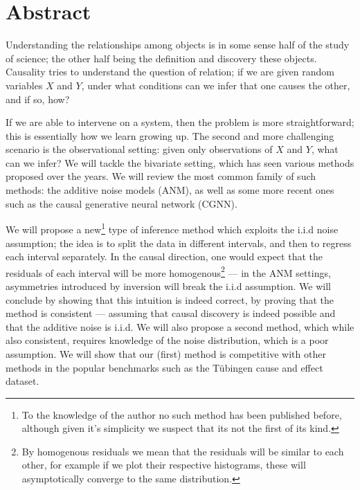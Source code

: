 

\cleardoublepage
\chapter*{Abstract}
\vspace{0.2\textheight}

Understanding the relationships among objects is in some sense half of the study of science; the other 
half being the definition and discovery these objects. Causality tries to understand the question of 
relation; if we are given random variables $X$ and $Y$, under what conditions can we infer that 
one causes the other, and if so, how? 


If we are able to intervene on a system, then the problem is more straightforward; this is essentially
how we learn growing up. The second and more challenging scenario is the observational setting: given 
only observations of $X$ and $Y$, what can we infer? We will tackle the bivariate setting, which has 
seen various methods proposed over the years. We will review the most common family of such methods: 
the additive noise models (ANM), as well as some more recent ones such as the causal generative neural 
network (CGNN). 

We will propose a new\footnote{To the knowledge of the author no such method has been published 
before, although given it's simplicity we suspect that its not the first of its kind.} 
type of inference method which exploits the i.i.d 
noise assumption; the idea is to split the data in different intervals, and then to regress each 
interval separately. In the causal direction, one would expect that the residuals of each 
interval will be more homogenous\footnote{By homogenous residuals we mean that the residuals will 
be similar to each other, for example if we plot their respective histograms, these will asymptotically 
converge to the same distribution.} --- in the ANM settings, asymmetries introduced
by inversion will break the i.i.d assumption. We will conclude by 
showing that this intuition is indeed correct, by proving that the method is consistent --- 
assuming that causal discovery is indeed possible and that the additive noise is i.i.d. We will
also propose a second method, which while also consistent, requires knowledge of the 
noise distribution, which is a poor assumption. We will show that our (first) method is competitive with 
other methods in the popular benchmarks such as the Tübingen cause and effect dataset. 



